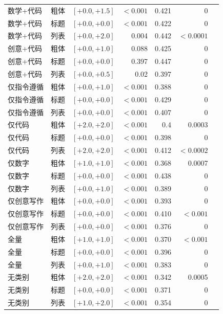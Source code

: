\documentclass[9pt,a4paper,fontset=windows]{ctexart}
\theoremstyle{definition}
\numberwithin{equation}{section}
\begin{document}
\begin{longtable}{llrrrrr}
数学+代码 & 粗体 & \([+0.0,+1.5]\) & \(<0.001\) & 0.421 & 0 \\
数学+代码 & 标题 & \([+0.0,+0.0]\) & \(<0.001\) & 0.422 & 0 \\
数学+代码 & 列表 & \([+0.0,+2.0]\) & 0.004 & 0.442 & \(<0.0001\) \\
创意+代码 & 粗体 & \([+0.0,+1.0]\) & 0.088 & 0.425 & 0 \\
创意+代码 & 标题 & \([+0.0,+0.0]\) & 0.397 & 0.447 & 0 \\
创意+代码 & 列表 & \([+0.0,+0.5]\) & 0.02 & 0.397 & 0 \\
仅指令遵循 & 粗体 & \([+0.0,+1.0]\) & \(<0.001\) & 0.388 & 0 \\
仅指令遵循 & 标题 & \([+0.0,+0.0]\) & \(<0.001\) & 0.429 & 0 \\
仅指令遵循 & 列表 & \([+0.0,+0.0]\) & \(<0.001\) & 0.407 & 0 \\
仅代码 & 粗体 & \([+2.0,+2.0]\) & \(<0.001\) & 0.4 & 0.0003 \\
仅代码 & 标题 & \([+0.0,+0.0]\) & \(<0.001\) & 0.398 & 0 \\
仅代码 & 列表 & \([+2.0,+2.0]\) & \(<0.001\) & 0.412 & \(<0.0002\) \\
仅数字 & 粗体 & \([+1.0,+1.0]\) & \(<0.001\) & 0.368 & 0.0007 \\
仅数字 & 标题 & \([+0.0,+0.0]\) & \(<0.001\) & 0.438 & 0 \\
仅数字 & 列表 & \([+0.0,+1.0]\) & \(<0.001\) & 0.389 & 0 \\
仅创意写作 & 粗体 & \([+0.0,+0.0]\) & \(<0.001\) & 0.393 & 0 \\
仅创意写作 & 标题 & \([+0.0,+0.0]\) & \(<0.001\) & 0.410 & \(<0.001\) \\
仅创意写作 & 列表 & \([+0.0,+0.0]\) & \(<0.001\) & 0.376 & 0 \\
全量 & 粗体 & \([+1.0,+1.0]\) & \(<0.001\) & 0.370 & \(<0.001\) \\
全量 & 标题 & \([+0.0,+0.0]\) & \(<0.001\) & 0.396 & 0 \\
全量 & 列表 & \([+0.0,+1.0]\) & \(<0.001\) & 0.383 & 0 \\
无类别 & 粗体 & \([+2.0,+2.0]\) & \(<0.001\) & 0.342 & 0.0005 \\
无类别 & 标题 & \([+0.0,+0.0]\) & \(<0.001\) & 0.371 & 0 \\
无类别 & 列表 & \([+1.0,+2.0]\) & \(<0.001\) & 0.354 & 0 \\
\bottomrule
\end{longtable}

\end{document}
